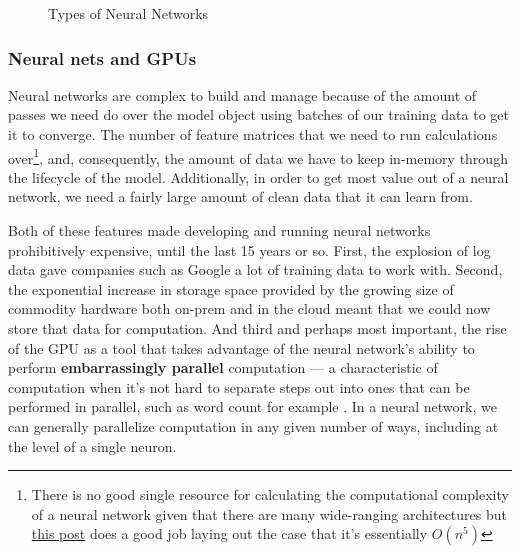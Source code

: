 \documentclass[11pt, table]{diazessay} %
\begin{document}
\begin{sloppypar}
\begin{figure}[H]
\centering
{}
\caption{Types of Neural Networks}
\end{figure}





\subsubsection{Neural nets and GPUs}

Neural networks are complex to build and manage because of the amount of passes we need do over the model object using batches of our training data to get it to converge. The number of feature matrices that we need to run calculations over\footnote{There is no good single resource for calculating the computational complexity of a neural network given that there are many wide-ranging architectures but   \href{https://lunalux.io/computational-complexity-of-neural-networks/}{this post} does a good job laying out the case that it's essentially $O(n^5)$}, and, consequently, the amount of data we have to keep in-memory through the lifecycle of the model. Additionally, in order to get most value out of a neural network, we need a fairly large amount of clean data that it can learn from. 

Both of these features made developing and running neural networks prohibitively expensive, until the last 15 years or so. First,  the explosion of log data gave companies such as Google a lot of training data to work with. Second,  the exponential increase in storage space provided by the growing size of commodity hardware both on-prem and in the cloud meant that we could now store that data for computation.  And third and perhaps most important, the rise of the GPU as a tool that takes advantage of the neural network's ability to perform \textbf{embarrassingly parallel} computation --- a characteristic of computation when it's not hard to separate steps out into ones that can be performed in parallel, such as word count for example . In a neural network, we can generally parallelize computation in any given number of ways, including at the level of a single neuron.  


\end{sloppypar}
\end{document}
